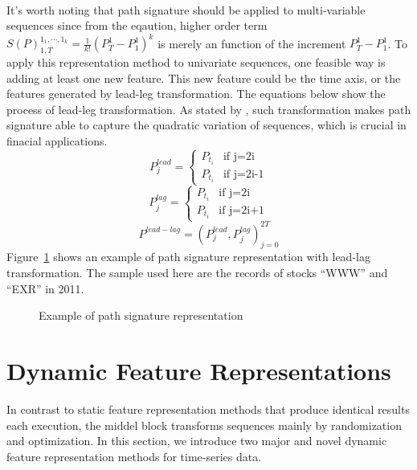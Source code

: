 \\It's worth noting that path signature should be applied to multi-variable sequences since from the eqaution, higher order term $S(P)_{1,T}^{1_1,\cdots,1_k} = \frac{1}{k!}(P_T^1-P_1^1)^k$ is merely an function of the increment $P_T^1-P_1^1$. To apply this representation method to univariate sequences, one feasible way is adding at least one new feature. This new feature could be the time axis, or the features generated by lead-leg transformation. The equations below show the process of lead-leg transformation. As stated by \cite{chevyrev2016primer}, such transformation makes path signature able to capture the quadratic variation of sequences, which is crucial in finacial applications. 
\begin{equation}
    P_j^{lead}=
    \begin{cases}
    P_{t_i}& \text{if j=2i}\\
    P_{t_i}& \text{if j=2i-1}
    \end{cases}   
\end{equation}
\begin{equation}
    P_j^{lag}=
    \begin{cases}
    P_{t_i}& \text{if j=2i}\\
    P_{t_i}& \text{if j=2i+1}
    \end{cases}   
\end{equation}
\begin{equation}
    P^{lead-lag} = (P_j^{lead},P_j^{lag})_{j=0}^{2T}
\end{equation}
Figure~\ref{fig:signature1} shows an example of path signature representation with lead-lag transformation. The sample used here are the records of stocks ``WWW'' and ``EXR'' in 2011.
\begin{figure}[!htbp]
    \centering 
    \caption{Example of path signature representation} 
    \label{fig:signature1} 
\end{figure} 


\section{Dynamic Feature Representations}
In contrast to static feature representation methods that produce identical results each execution, the middel block transforms sequences mainly by randomization and optimization. In this section, we introduce two major and novel dynamic feature representation methods for time-series data.
